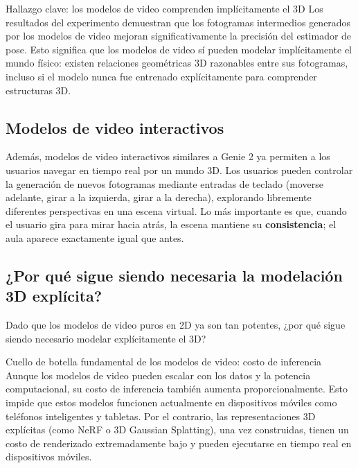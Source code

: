 \documentclass[a4paper]{article}
\begin{document}
\begin{importantbox}{Hallazgo clave: los modelos de video comprenden implícitamente el 3D}
Los resultados del experimento demuestran que los fotogramas intermedios generados por los modelos de video mejoran significativamente la precisión del estimador de pose. Esto significa que los modelos de video sí pueden modelar implícitamente el mundo físico: existen relaciones geométricas 3D razonables entre sus fotogramas, incluso si el modelo nunca fue entrenado explícitamente para comprender estructuras 3D.
\end{importantbox}

\subsection{Modelos de video interactivos}

Además, modelos de video interactivos similares a Genie 2 ya permiten a los usuarios navegar en tiempo real por un mundo 3D. Los usuarios pueden controlar la generación de nuevos fotogramas mediante entradas de teclado (moverse adelante, girar a la izquierda, girar a la derecha), explorando libremente diferentes perspectivas en una escena virtual. Lo más importante es que, cuando el usuario gira para mirar hacia atrás, la escena mantiene su \textbf{consistencia}; el aula aparece exactamente igual que antes.

\subsection{¿Por qué sigue siendo necesaria la modelación 3D explícita?}

Dado que los modelos de video puros en 2D ya son tan potentes, ¿por qué sigue siendo necesario modelar explícitamente el 3D?

\begin{warningbox}{Cuello de botella fundamental de los modelos de video: costo de inferencia}
Aunque los modelos de video pueden escalar con los datos y la potencia computacional, su costo de inferencia también aumenta proporcionalmente. Esto impide que estos modelos funcionen actualmente en dispositivos móviles como teléfonos inteligentes y tabletas. Por el contrario, las representaciones 3D explícitas (como NeRF o 3D Gaussian Splatting), una vez construidas, tienen un costo de renderizado extremadamente bajo y pueden ejecutarse en tiempo real en dispositivos móviles.
\end{warningbox}
\end{document}
